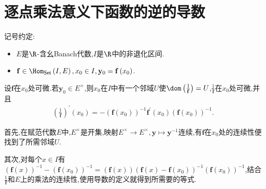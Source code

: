 \section{逐点乘法意义下函数的逆的导数}

记号约定:
\begin{itemize}
	\item $E$是$\R$-含幺Banach代数,$I$是$\R$中的非退化区间.
	\item $\mathbf{f}\in\Hom_{\mathsf{Set}}\left(I,E\right),x_{0}\in I,\mathbf{y}_{0}=\mathbf{f}\left(x_{0}\right)$.
\end{itemize}

\begin{proposition}{}{}
	设$\mathbf{f}$在$x_{0}$处可微.若$\mathbf{y}_{0}\in E^{\times}$,则$x_{0}$在$I$中有一个邻域$U$使$\dom\left(\frac{1}{\mathbf{f}}\right)=U$,$\frac{1}{\mathbf{f}}$在$x_{0}$处可微,并且
	\begin{align*}
		\left(\frac{1}{\mathbf{f}}\right)^{\prime}\left(x_{0}\right)=-\left(\mathbf{f}\left(x_{0}\right)\right)^{-1}\mathbf{f}^{\prime}\left(x_{0}\right)\left(\mathbf{f}\left(x_{0}\right)\right)^{-1}.
	\end{align*}
\end{proposition}

\begin{sketch}{}{}
	首先,在赋范代数$E$中,$E^{\times}$是开集,映射$E^{\times}\to E^{\times},\mathbf{y}\mapsto\mathbf{y}^{-1}$连续,有$\mathbf{f}$在$x_{0}$处的连续性便找到了所需邻域$U$.
	
	其次,对每个$x\in I$有$\left(\mathbf{f}\left(x\right)\right)^{-1}-\left(\mathbf{f}\left(x_{0}\right)\right)^{-1}=\left(\mathbf{f}\left(x\right)\right)\left(\mathbf{f}\left(x\right)-\mathbf{f}\left(x_{0}\right)\right)^{-1}\left(\mathbf{f}\left(x_{0}\right)\right)^{-1}$,结合$\frac{1}{\mathbf{f}}$和$E$上的乘法的连续性,使用导数的定义就得到所需要的等式.
\end{sketch}

